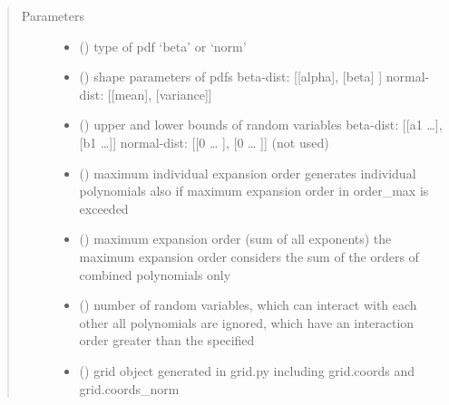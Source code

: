 \documentclass[letterpaper,10pt,english,openany,oneside]{sphinxmanual}
\begin{document}
\begin{fulllineitems}
\begin{quote}\begin{description}
\item[{Parameters}] \leavevmode\begin{itemize}
\item {} 
 (\sphinxstyleliteralemphasis{\sphinxupquote{{[}}}\sphinxstyleliteralemphasis{\sphinxupquote{{]} }}) \textendash{} type of pdf ‘beta’ or ‘norm’

\item {} 
 () \textendash{} shape parameters of pdfs
beta-dist:   {[}{[}alpha{]}, {[}beta{]}    {]}
normal-dist: {[}{[}mean{]},  {[}variance{]}{]}

\item {} 
 () \textendash{} upper and lower bounds of random variables
beta-dist:   {[}{[}a1 …{]}, {[}b1 …{]}{]}
normal-dist: {[}{[}0 … {]}, {[}0 … {]}{]} (not used)

\item {} 
 (\sphinxstyleliteralemphasis{\sphinxupquote{{[}}}\sphinxstyleliteralemphasis{\sphinxupquote{{]} }}) \textendash{} maximum individual expansion order
generates individual polynomials also if maximum expansion order in order\_max is exceeded

\item {} 
 () \textendash{} maximum expansion order (sum of all exponents)
the maximum expansion order considers the sum of the orders of combined polynomials only

\item {} 
 () \textendash{} number of random variables, which can interact with each other
all polynomials are ignored, which have an interaction order greater than the specified

\item {} 
 () \textendash{} grid object generated in grid.py including grid.coords and grid.coords\_norm


\end{itemize}
\end{description}
\end{quote}
\end{fulllineitems}
\end{document}
